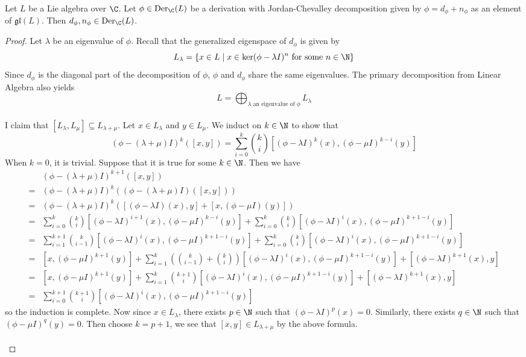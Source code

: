 \documentclass[a4paper]{article}
\begin{document}
\begin{lmm}{}{} Let $L$ be a Lie algebra over $\C$. Let $\phi\in\text{Der}_\C(L)$ be a derivation with Jordan-Chevalley decomposition given by $\phi=d_\phi+n_\phi$ as an element of $\mathfrak{gl}(L)$. Then $d_\phi,n_\phi\in\text{Der}_\C(L)$. \tcbline
\begin{proof}
Let $\lambda$ be an eigenvalue of $\phi$. Recall that the generalized eigenspace of $d_\phi$ is given by $$L_\lambda=\{x\in L\;|\;x\in\ker(\phi-\lambda I)^n\text{ for some }n\in\N\}$$ Since $d_\phi$ is the diagonal part of the decomposition of $\phi$, $\phi$ and $d_\phi$ share the same eigenvalues. The primary decomposition from Linear Algebra also yields $$L=\bigoplus_{\lambda\text{ an eigenvalue of }\phi}L_\lambda$$~\\

I claim that $[L_\lambda,L_\mu]\subseteq L_{\lambda+\mu}$. Let $x\in L_\lambda$ and $y\in L_\mu$. We induct on $k\in\N$ to show that $$(\phi-(\lambda+\mu)I)^k([x,y])=\sum_{i=0}^k\binom{k}{i}\left[(\phi-\lambda I)^k(x),(\phi-\mu I)^{k-i}(y)\right]$$ When $k=0$, it is trivial. Suppose that it is true for some $k\in\N$. Then we have 
\begin{align*}
&(\phi-(\lambda+\mu)I)^{k+1}([x,y])\\
=&(\phi-(\lambda+\mu)I)^k((\phi-(\lambda+\mu)I)([x,y]))\\
=&(\phi-(\lambda+\mu)I)^k([(\phi-\lambda I)(x),y]+[x,(\phi-\mu I)(y)])\\
=&\sum_{i=0}^k\binom{k}{i}\left[(\phi-\lambda I)^{i+1}(x),(\phi-\mu I)^{k-i}(y)\right]+\sum_{i=0}^k\binom{k}{i}\left[(\phi-\lambda I)^i(x),(\phi-\mu I)^{k+1-i}(y)\right]\\
=&\sum_{i=1}^{k+1}\binom{k}{i-1}\left[(\phi-\lambda I)^i(x),(\phi-\mu I)^{k+1-i}(y)\right]+\sum_{i=0}^k\binom{k}{i}\left[(\phi-\lambda I)^i(x),(\phi-\mu I)^{k+1-i}(y)\right]\\
=&\left[x,(\phi-\mu I)^{k+1}(y)\right]+\sum_{i=1}^k\left(\binom{k}{i-1}+\binom{k}{i}\right)\left[(\phi-\lambda I)^i(x),(\phi-\mu I)^{k+1-i}(y)\right]+\left[(\phi-\lambda I)^{k+1}(x),y\right]\\
=&\left[x,(\phi-\mu I)^{k+1}(y)\right]+\sum_{i=1}^k\binom{k+1}{i}\left[(\phi-\lambda I)^i(x),(\phi-\mu I)^{k+1-i}(y)\right]+\left[(\phi-\lambda I)^{k+1}(x),y\right]\\
=&\sum_{i=0}^{k+1}\binom{k+1}{i}\left[(\phi-\lambda I)^i(x),(\phi-\mu I)^{k+1-i}(y)\right]
\end{align*}
so the induction is complete. Now since $x\in L_\lambda$, there exists $p\in\N$ such that $(\phi-\lambda I)^p(x)=0$. Similarly, there exists $q\in\N$ such that $(\phi-\mu I)^q(y)=0$. Then choose $k=p+1$, we see that $[x,y]\in L_{\lambda+\mu}$ by the above formula. \\~\\


\end{proof}
\end{lmm}
\end{document}
